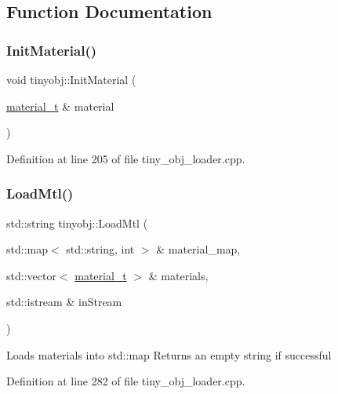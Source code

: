 \subsection{Function Documentation}
\mbox{\label{namespacetinyobj_a02670ede322e1cc5172fbaff43a1bdb5}} 
\subsubsection{\texorpdfstring{Init\+Material()}{InitMaterial()}}
{\footnotesize\ttfamily void tinyobj\+::\+Init\+Material (\begin{DoxyParamCaption}\item[{\hyperlink{structtinyobj_1_1material__t}{material\+\_\+t} \&}]{material }\end{DoxyParamCaption})}



Definition at line 205 of file tiny\+\_\+obj\+\_\+loader.\+cpp.

\mbox{\label{namespacetinyobj_aff17f9085eec34bcc7ba97025122e732}} 
\subsubsection{\texorpdfstring{Load\+Mtl()}{LoadMtl()}}
{\footnotesize\ttfamily std\+::string tinyobj\+::\+Load\+Mtl (\begin{DoxyParamCaption}\item[{std\+::map$<$ std\+::string, int $>$ \&}]{material\+\_\+map,  }\item[{std\+::vector$<$ \hyperlink{structtinyobj_1_1material__t}{material\+\_\+t} $>$ \&}]{materials,  }\item[{std\+::istream \&}]{in\+Stream }\end{DoxyParamCaption})}

Loads materials into std\+::map Returns an empty string if successful 

Definition at line 282 of file tiny\+\_\+obj\+\_\+loader.\+cpp.

\mbox{\label{namespacetinyobj_a8a1b09e98bbe6ad056bf30fdce87b3c5}} 
